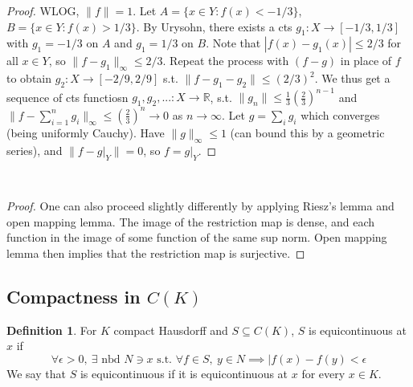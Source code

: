 \documentclass{article}
\theoremstyle{definition}
\newtheorem{defn}{Definition}[section]
\theoremstyle{remark}
\theoremstyle{plain}
\newcommand{\RR}{\mathbb{R}}
\begin{document}
\begin{proof}
    WLOG, $\|f\|=1$. Let $A=\{x\in Y:f(x)<-1/3\}$, $B=\{x\in Y:f(x)>1/3\}$. By Urysohn, there exists a cts $g_1:X\to [-1/3,1/3]$ with $g_1=-1/3$ on $A$ and $g_1=1/3$ on $B$. Note that $|f(x)-g_1(x)|\le 2/3$ for all $x\in Y$, so $\|f-g_1\|_\infty\le2/3$. Repeat the process with $(f-g)$ in place of $f$ to obtain $g_2:X\to[-2/9,2/9]$ s.t. $\|f-g_1-g_2\|\le (2/3)^2$. We thus get a sequence of cts functiosn $g_1,g_2,...:X\to\RR$, s.t. $\|g_n\|\le\frac13(\frac23)^{n-1}$ and $\|f-\sum_{i=1}^ng_i\|_\infty\le(\frac23)^n\to0$ as $n\to\infty$. Let $g=\sum_ig_i$ which converges (being uniformly Cauchy). Have $\|g\|_\infty\le 1$ (can bound this by a geometric series), and $\|f-g|_Y\|=0$, so $f=g|_Y$.
\end{proof}\
\begin{proof}
    One can also proceed slightly differently by applying Riesz's lemma and open mapping lemma. The image of the restriction map is dense, and each function in the image of some function of the same sup norm. Open mapping lemma then implies that the restriction map is surjective.
\end{proof}

\subsection{Compactness in $C(K)$}
\begin{defn}
    For $K$ compact Hausdorff and $S\subseteq C(K)$, $S$ is equicontinuous at $x$ if 
    \[\forall\epsilon>0,\ \exists\text{ nbd } N\ni x\text{ s.t. }\forall f\in S,\ y\in N\implies |f(x)-f(y)<\epsilon\]
    We say that $S$ is equicontinuous if it is equicontinuous at $x$ for every $x\in K$.
\end{defn}
\end{document}
